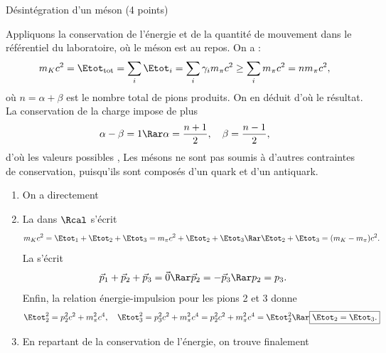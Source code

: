 \begin{exo}[PC][1][devoir]{Désintégration d'un méson (4 points)}
\begin{quest}
  {
    Appliquons la conservation de l'énergie et de la quantité de mouvement dans le référentiel du laboratoire, où le méson est au repos. On a :
    $$
    m_K c^2 = \Etot_{\rm tot} = \sum_i \Etot_i = \sum_i \gamma_i m_\pi c^2 \geq \sum_i m_\pi c^2 = n m_\pi c^2,
    $$
    où $n=\alpha + \beta$ est le nombre total de pions produits. On en déduit 
    d'où le résultat. La conservation de la charge impose de plus 
    $$
    \alpha - \beta = 1 \Rar \alpha = \frac{n+1}{2}, \quad \beta = \frac{n-1}{2},
    $$
    d'où les valeurs possibles ,
    Les mésons ne sont pas soumis à d'autres contraintes de conservation, puisqu'ils sont composés d'un quark et d'un antiquark.
  }

  {
    \begin{enumerate}
      \item On a directement 
      \item
      La  dans $\Rcal$ s'écrit
      $$
      m_K c^2 = \Etot_1 + \Etot_2 + \Etot_3 = m_\pi c^2 + \Etot_2 + \Etot_3 \Rar \Etot_2 + \Etot_3 = (m_K - m_\pi) c^2.
      $$
      La  s'écrit
      $$
      \Vec{p}_1 + \Vec{p}_2 + \Vec{p}_3 = \Vec{0} \Rar \Vec{p}_2 = - \Vec{p}_3 \Rar p_2 = p_3.
      $$
      Enfin, la relation énergie-impulsion pour les pions 2 et 3 donne
      $$
      \Etot_2^2 = p_2^2 c^2 + m_\pi^2 c^4, \quad \Etot_3^2 = p_3^2 c^2 + m_\pi^2 c^4 = p_2^2 c^2 + m_\pi^2 c^4 = \Etot_2^2 \Rar \boxed{\Etot_2 = \Etot_3.}
      $$
      \item En repartant de la conservation de l'énergie, on trouve finalement 
    \end{enumerate}
  }

\end{quest}
\end{exo}


